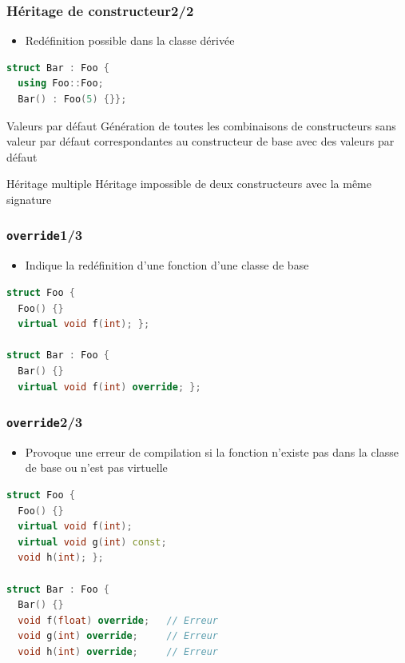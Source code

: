 \documentclass[C++.tex]{subfiles}
\begin{document}
\begin{frame}[fragile]
	\frametitle{Héritage de constructeur\titlehfill{}2/2}
	\begin{itemize}
		\item Redéfinition possible dans la classe dérivée
	\end{itemize}

	\begin{lstlisting}[language=C++]
struct Bar : Foo {
  using Foo::Foo;
  Bar() : Foo(5) {}};\end{lstlisting}

	\begin{alertblock}{Valeurs par défaut}
		Génération de toutes les combinaisons de constructeurs sans valeur par défaut correspondantes au constructeur de base avec des valeurs par défaut

	\end{alertblock}

	\begin{alertblock}{Héritage multiple}
		Héritage impossible de deux constructeurs avec la même signature
	\end{alertblock}

\end{frame}

\begin{frame}[fragile]
	\frametitle{\lstinline|override|\titlehfill{}1/3}
	\begin{itemize}
		\item Indique la redéfinition d'une fonction d'une classe de base
	\end{itemize}

	\begin{lstlisting}[language=C++]
struct Foo {
  Foo() {}
  virtual void f(int); };

struct Bar : Foo {
  Bar() {}
  virtual void f(int) override; };
\end{lstlisting}
\end{frame}

\begin{frame}[fragile]
	\frametitle{\lstinline|override|\titlehfill{}2/3}
	\begin{itemize}
		\item Provoque une erreur de compilation si la fonction n'existe pas dans la classe de base ou n'est pas virtuelle
	\end{itemize}

	\begin{lstlisting}[language=C++]
struct Foo {
  Foo() {}
  virtual void f(int); 
  virtual void g(int) const;
  void h(int); };

struct Bar : Foo {
  Bar() {}
  void f(float) override;   // Erreur 
  void g(int) override;     // Erreur
  void h(int) override;     // Erreur\end{lstlisting}
\end{frame}
\end{document}
